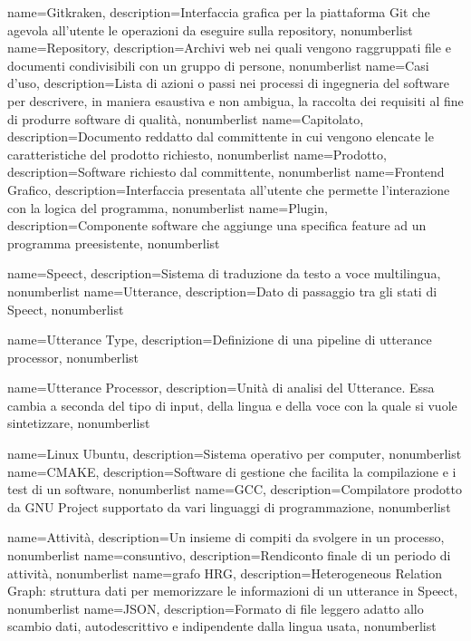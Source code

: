 {
	name={Gitkraken},
	description={Interfaccia grafica per la piattaforma Git che agevola all'utente le operazioni da eseguire sulla repository},
	nonumberlist
}
{
	name={Repository},
	description={Archivi web nei quali vengono raggruppati file e documenti condivisibili con un gruppo di persone},
	nonumberlist
}
{
	name={Casi d'uso},
	description={Lista di azioni o passi nei processi di ingegneria del software per descrivere, in maniera esaustiva e non ambigua, la raccolta dei requisiti al fine di produrre software di qualità},
	nonumberlist
}
{
	name={Capitolato},
	description={Documento reddatto dal committente in cui vengono elencate le caratteristiche del prodotto richiesto},
	nonumberlist
}
{
	name={Prodotto},
	description={Software richiesto dal committente},
	nonumberlist
}
{
	name={Frontend Grafico},
	description={Interfaccia presentata all'utente che permette l'interazione con la logica del programma},
	nonumberlist
}
{
	name={Plugin},
	description={Componente software che aggiunge una specifica feature ad un programma preesistente},
	nonumberlist
}

{
	name={Speect},
	description={Sistema di traduzione da testo a voce multilingua},
	nonumberlist
}
{
	name={Utterance},
	description={Dato di passaggio tra gli stati di Speect},
	nonumberlist
}

{
name={Utterance Type},
description={Definizione di una pipeline di utterance processor},
nonumberlist
}

{
	name={Utterance Processor},
	description={Unità di analisi del Utterance. Essa cambia a seconda del tipo di input, della lingua e della voce con la quale si vuole sintetizzare},
	nonumberlist
}

{
	name={Linux Ubuntu},
	description={Sistema operativo per computer},
	nonumberlist
}
{
	name={CMAKE},
	description={Software di gestione che facilita la compilazione e i test di un software},
	nonumberlist
}
{
	name={GCC},
	description={Compilatore prodotto da GNU Project supportato da vari linguaggi di programmazione},
	nonumberlist
}

{
	name={Attività},
	description={Un insieme di compiti da svolgere in un processo},
	nonumberlist
}
{
	name={consuntivo},
	description={Rendiconto finale di un periodo di attività},
	nonumberlist
}
{
	name={grafo HRG},
	description={Heterogeneous Relation Graph: struttura dati per memorizzare le informazioni di un utterance in Speect},
	nonumberlist
}
{
	name={JSON},
	description={Formato di file leggero adatto allo scambio dati, autodescrittivo e indipendente dalla lingua usata},
	nonumberlist
}

